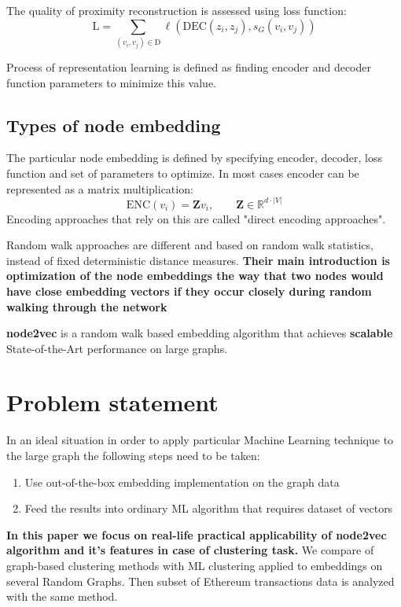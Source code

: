 The quality of proximity reconstruction is assessed using loss function: 
$$
   \mathrm{L} = \sum_{(v_i, v_j) \in \mathrm{D}} \ell\left(
     \mathrm{DEC}(z_i, z_j), s_G(v_i, v_j)
   \right)
$$

Process of representation learning is defined as finding encoder and decoder function parameters to minimize this value.

\subsection{Types of node embedding}

The particular node embedding is defined by specifying encoder, decoder, loss function and set of parameters to optimize. In most cases encoder can be represented as a matrix multiplication: 
$$
  \mathrm{ENC}(v_i) = \mathbf{Z} v_i, \qquad \mathbf{Z} \in \mathbb{R}^{d \cdot |V|}
$$
Encoding approaches that rely on this are called "direct encoding approaches". \cite{DBLP:journals/corr/abs-1709-05584}

Random walk approaches are different and based on random walk statistics, instead of fixed deterministic distance measures. \textbf{Their main introduction is optimization of the node embeddings the way that two nodes would have close embedding vectors if they occur closely during random walking through the network}

\textbf{node2vec}\cite{DBLP:journals/corr/GroverL16} is a random walk based embedding algorithm that achieves \textbf{scalable} State-of-the-Art performance on large graphs.

\section{Problem statement}
In an ideal situation in order to apply particular Machine Learning technique to the large graph the following steps need to be taken:
\begin{enumerate}
\item Use out-of-the-box embedding implementation on the graph data
\item Feed the results into ordinary ML algorithm that requires dataset of vectors
\end{enumerate}

\textbf{In this paper we focus on real-life practical applicability of node2vec algorithm and it's features in case of clustering task.} We compare of graph-based clustering methods with ML clustering applied to embeddings on several Random Graphs. Then subset of Ethereum transactions data is analyzed with the same method.